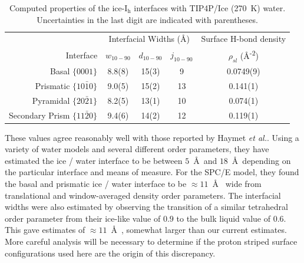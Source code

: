 \begin{table}[h]
\centering
\caption{Computed properties of the
  ice-I$_\mathrm{h}$ interfaces with TIP4P/Ice (270~K) water. Uncertainties in the last digit are indicated with
  parentheses. \label{tab:propsTIP4P}}
\begin{tabular}{r|ccc|c}  
  \toprule
  & \multicolumn{3}{c|}{Interfacial Widths (\AA)} & 
                                                    Surface H-bond
                                                    density \\
  Interface & $w_\mathrm{10-90}$ &  $d_\mathrm{10-90}$ & $j_\mathrm{10-90}$ & $\rho_{sl}$ (\AA\textsuperscript{-2}) \\ 
  \midrule
  Basal  $\{0001\}$                 & 8.8(8) & 15(3) & 9   & 0.0749(9)\\
  Prismatic  $\{10\bar{1}0\}$       & 9.0(5) & 15(2) & 13  & 0.141(1) \\
  Pyramidal  $\{20\bar{2}1\}$       & 8.2(5) & 13(1) & 10  & 0.074(1) \\
  Secondary Prism  $\{11\bar{2}0\}$ & 9.4(6) & 14(2)   & 12  & 0.119(1) \\
  \bottomrule
\end{tabular}
\end{table}

These values agree reasonably well with those reported by Haymet
\textit{et
  al.}.\cite{Karim1988,Karim1990,Hayward2001,Bryk2002,Hayward2002,Bryk2004}
Using a variety of water models and several different order
parameters, they have estimated the ice / water interface to be
between $5$~\AA~and $18$~\AA~depending on the particular interface and
means of measure.  For the SPC/E model, they found the basal and
prismatic ice / water interface to be $\approx 11$~\AA~ wide from
translational and window-averaged density order parameters. The
interfacial widths were also estimated by observing the transition of
a similar tetrahedral order parameter from their ice-like value of
$0.9$ to the bulk liquid value of $0.6$. This gave estimates of
$\approx 11$~\AA~, somewhat larger than our current estimates. More
careful analysis will be necessary to determine if the proton striped
surface configurations used here are the origin of this discrepancy.

